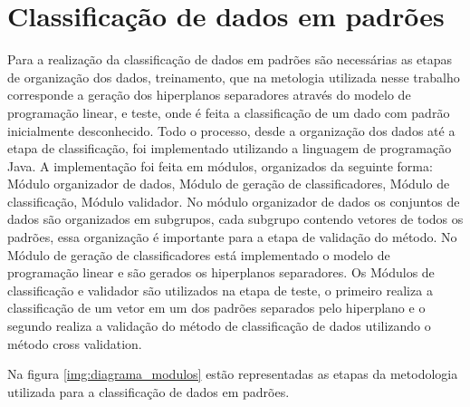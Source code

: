 \chapter{Classificação de dados em padrões}
Para a realização da classificação de dados em padrões são necessárias as etapas de organização dos dados, treinamento, que na metologia utilizada nesse trabalho corresponde a geração dos hiperplanos separadores através do modelo de programação linear, e teste, onde é feita a classificação de um dado com padrão inicialmente desconhecido.
Todo o processo, desde a organização dos dados até a etapa de classificação, foi implementado utilizando a linguagem de programação Java. A implementação foi feita em módulos, organizados da seguinte forma: Módulo organizador de dados, Módulo de geração de classificadores, Módulo de classificação, Módulo validador. No módulo organizador de dados os conjuntos de dados são organizados em subgrupos, cada subgrupo contendo vetores de todos os padrões, essa organização é importante para a etapa de validação do método. No Módulo de geração de classificadores está implementado o modelo de programação linear e são gerados os hiperplanos separadores. Os Módulos de classificação e validador são utilizados na etapa de teste, o primeiro realiza a classificação de um vetor em um dos padrões separados pelo hiperplano e o segundo realiza a validação do método de classificação de dados utilizando o método cross validation.

Na figura \ref{img:diagrama_modulos} estão representadas as etapas da metodologia utilizada para a classificação de dados em padrões.

